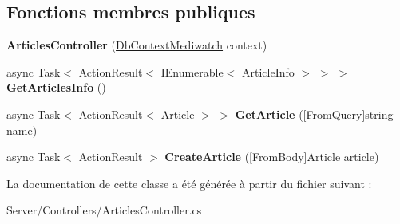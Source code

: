 \subsection*{Fonctions membres publiques}
\begin{DoxyCompactItemize}
\item 
\mbox{\label{class_blazing_blog_1_1_server_1_1_controllers_1_1_articles_controller_a3881e802459fed1ecf975c20c9b17444}} 
{\bfseries Articles\+Controller} (\hyperlink{class_server_1_1_db_context_mediwatch}{Db\+Context\+Mediwatch} context)
\item 
\mbox{\label{class_blazing_blog_1_1_server_1_1_controllers_1_1_articles_controller_a9970ba338169d8ef258c10663bf211b1}} 
async Task$<$ Action\+Result$<$ I\+Enumerable$<$ Article\+Info $>$ $>$ $>$ {\bfseries Get\+Articles\+Info} ()
\item 
\mbox{\label{class_blazing_blog_1_1_server_1_1_controllers_1_1_articles_controller_a69e1b42a4f3198d4737296e661f95a75}} 
async Task$<$ Action\+Result$<$ Article $>$ $>$ {\bfseries Get\+Article} (\mbox{[}From\+Query\mbox{]}string name)
\item 
\mbox{\label{class_blazing_blog_1_1_server_1_1_controllers_1_1_articles_controller_af37d427d00f7f410f1719d8fd9a47f68}} 
async Task$<$ Action\+Result $>$ {\bfseries Create\+Article} (\mbox{[}From\+Body\mbox{]}Article article)
\end{DoxyCompactItemize}


La documentation de cette classe a été générée à partir du fichier suivant \+:\begin{DoxyCompactItemize}
\item 
Server/\+Controllers/Articles\+Controller.\+cs\end{DoxyCompactItemize}
